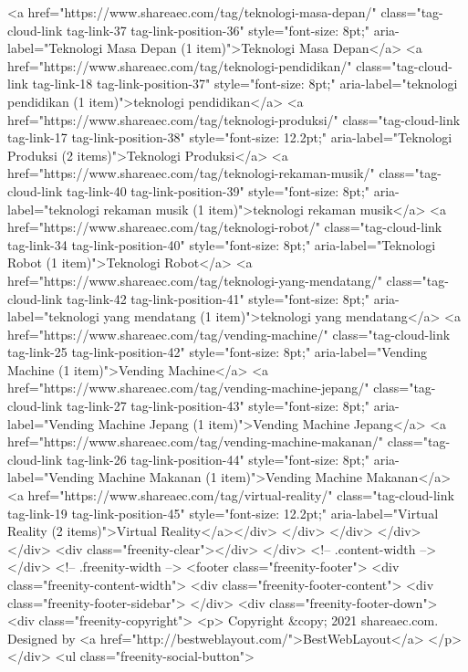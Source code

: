 <a href="https://www.shareaec.com/tag/teknologi-masa-depan/" class="tag-cloud-link tag-link-37 tag-link-position-36" style="font-size: 8pt;" aria-label="Teknologi Masa Depan (1 item)">Teknologi Masa Depan</a>
<a href="https://www.shareaec.com/tag/teknologi-pendidikan/" class="tag-cloud-link tag-link-18 tag-link-position-37" style="font-size: 8pt;" aria-label="teknologi pendidikan (1 item)">teknologi pendidikan</a>
<a href="https://www.shareaec.com/tag/teknologi-produksi/" class="tag-cloud-link tag-link-17 tag-link-position-38" style="font-size: 12.2pt;" aria-label="Teknologi Produksi (2 items)">Teknologi Produksi</a>
<a href="https://www.shareaec.com/tag/teknologi-rekaman-musik/" class="tag-cloud-link tag-link-40 tag-link-position-39" style="font-size: 8pt;" aria-label="teknologi rekaman musik (1 item)">teknologi rekaman musik</a>
<a href="https://www.shareaec.com/tag/teknologi-robot/" class="tag-cloud-link tag-link-34 tag-link-position-40" style="font-size: 8pt;" aria-label="Teknologi Robot (1 item)">Teknologi Robot</a>
<a href="https://www.shareaec.com/tag/teknologi-yang-mendatang/" class="tag-cloud-link tag-link-42 tag-link-position-41" style="font-size: 8pt;" aria-label="teknologi yang mendatang (1 item)">teknologi yang mendatang</a>
<a href="https://www.shareaec.com/tag/vending-machine/" class="tag-cloud-link tag-link-25 tag-link-position-42" style="font-size: 8pt;" aria-label="Vending Machine (1 item)">Vending Machine</a>
<a href="https://www.shareaec.com/tag/vending-machine-jepang/" class="tag-cloud-link tag-link-27 tag-link-position-43" style="font-size: 8pt;" aria-label="Vending Machine Jepang (1 item)">Vending Machine Jepang</a>
<a href="https://www.shareaec.com/tag/vending-machine-makanan/" class="tag-cloud-link tag-link-26 tag-link-position-44" style="font-size: 8pt;" aria-label="Vending Machine Makanan (1 item)">Vending Machine Makanan</a>
<a href="https://www.shareaec.com/tag/virtual-reality/" class="tag-cloud-link tag-link-19 tag-link-position-45" style="font-size: 12.2pt;" aria-label="Virtual Reality (2 items)">Virtual Reality</a></div>
</div>		</div>
	</div>
</div>
<div class="freenity-clear"></div>
		</div>  <!-- .content-width -->
	</div> <!-- .freenity-width -->
<footer class="freenity-footer">
	<div class="freenity-content-width">
		<div class="freenity-footer-content">
			<div class="freenity-footer-sidebar">
							</div>
			<div class="freenity-footer-down">
				<div class="freenity-copyright">
					<p>
						Copyright &copy; 2021 shareaec.com. Designed by <a href="http://bestweblayout.com/">BestWebLayout</a>					</p>
				</div>
					<ul class="freenity-social-button">
